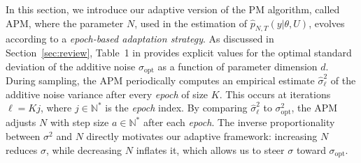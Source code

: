 \documentclass[pdflatex,sn-mathphys-num]{sn-jnl}
\newcommand{\nats}{\mathbb{N}}
\newcommand{\textopt}{\text{opt}}
\theoremstyle{thmstyleone}
\theoremstyle{thmstyletwo}
\theoremstyle{thmstylethree}
\begin{document}
In this section, we introduce our adaptive version of the PM algorithm, called APM, where the parameter $N$, used in the estimation of \( \widehat{p}_{N,T}(y | \theta, U) \), evolves according to a \textit{epoch-based adaptation strategy}. As discussed in Section~\ref{sec:review}, Table~1 in \cite{schmon_large-sample_2021} provides explicit values for the optimal standard deviation of the additive noise $\sigma_{\text{opt}}$ as a function of parameter dimension $d$. During sampling, the APM periodically computes an empirical estimate \( \hat{\sigma}^2_\ell \) of the additive noise variance after every \textit{epoch} of size \( K \). This occurs at iterations \( \ell = K j \), where \( j \in \nats^*\) is the \textit{epoch} index. By comparing $\hat{\sigma}_\ell^2$ to $\sigma^2_{\text{opt}}$, the APM adjusts $N$ with step size $a \in \nats^*$ after each \textit{epoch}. The inverse proportionality between $\sigma^2$ and $N$ directly motivates our adaptive framework: increasing \( N \) reduces \( \sigma \), while decreasing \( N \) inflates it, which allows us to steer $\sigma$ toward $\sigma_\textopt$.
 
\end{document}

